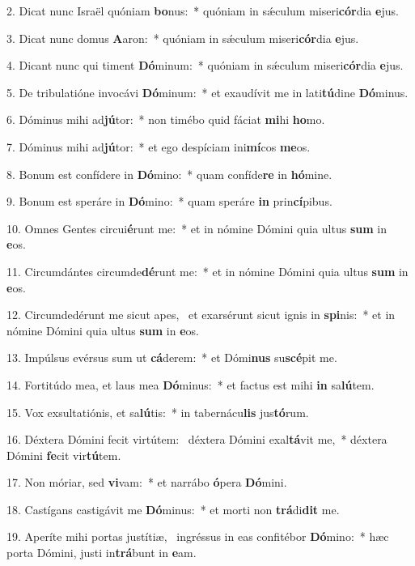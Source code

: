 2. Dicat nunc Israël quóniam \textbf{bo}nus:~*  quóniam in sǽculum miseri\textbf{cór}dia \textbf{e}jus.\

3. Dicat nunc domus \textbf{A}aron:~*  quóniam in sǽculum miseri\textbf{cór}dia \textbf{e}jus.\

4. Dicant nunc qui timent \textbf{Dó}minum:~*  quóniam in sǽculum miseri\textbf{cór}dia \textbf{e}jus.\

5. De tribulatióne invocávi \textbf{Dó}minum:~*  et exaudívit me in lati\textbf{tú}dine \textbf{Dó}minus.\

6. Dóminus mihi ad\textbf{jú}tor:~*  non timébo quid fáciat \textbf{mi}hi \textbf{ho}mo.\

7. Dóminus mihi ad\textbf{jú}tor:~*  et ego despíciam ini\textbf{mí}cos \textbf{me}os.\

8. Bonum est confídere in \textbf{Dó}mino:~*  quam confíde\textbf{re} in \textbf{hó}mine.\

9. Bonum est speráre in \textbf{Dó}mino:~*  quam speráre \textbf{in} prin\textbf{cí}pibus.\

10. Omnes Gentes circui\textbf{é}runt me:~*  et in nómine Dómini quia ultus \textbf{sum} in \textbf{e}os.\

11. Circumdántes circumde\textbf{dé}runt me:~*  et in nómine Dómini quia ultus \textbf{sum} in \textbf{e}os.\

12. Circumdedérunt me sicut apes, \dag\  et exarsérunt sicut ignis in \textbf{spi}nis:~*  et in nómine Dómini quia ultus \textbf{sum} in \textbf{e}os.\

13. Impúlsus evérsus sum ut \textbf{cá}derem:~*  et Dómi\textbf{nus} su\textbf{scé}pit me.\

14. Fortitúdo mea, et laus mea \textbf{Dó}minus:~*  et factus est mihi \textbf{in} sa\textbf{lú}tem.\

15. Vox exsultatiónis, et sa\textbf{lú}tis:~*  in tabernácu\textbf{lis} jus\textbf{tó}rum.\

16. Déxtera Dómini fecit virtútem: \dag\  déxtera Dómini exal\textbf{tá}vit me,~*  déxtera Dómini \textbf{fe}cit vir\textbf{tú}tem.\

17. Non móriar, sed \textbf{vi}vam:~*  et narrábo \textbf{ó}pera \textbf{Dó}mini.\

18. Castígans castigávit me \textbf{Dó}minus:~*  et morti non \textbf{trá}di\textbf{dit} me.\

19. Aperíte mihi portas justítiæ, \dag\  ingréssus in eas confitébor \textbf{Dó}mino:~*  hæc porta Dómini, justi in\textbf{trá}bunt in \textbf{e}am.\

